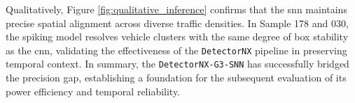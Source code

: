 Qualitatively, Figure \ref{fig:qualitative_inference} confirms that the \gls{snn} maintains precise spatial alignment across diverse traffic densities. In Sample 178 and 030, the spiking model resolves vehicle clusters with the same degree of box stability as the \gls{cnn}, validating the effectiveness of the \texttt{DetectorNX} pipeline in preserving temporal context. In summary, the \texttt{DetectorNX-G3-SNN} has successfully bridged the precision gap, establishing a foundation for the subsequent evaluation of its power efficiency and temporal reliability.
